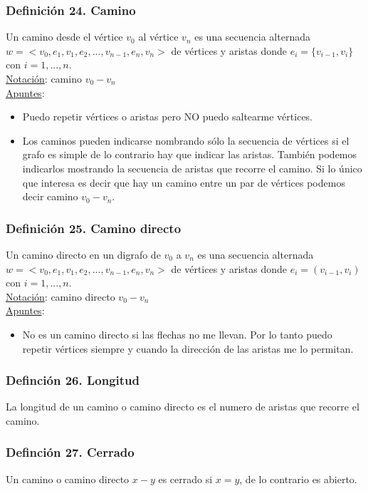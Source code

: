 \documentclass{article}
\begin{document}
\subsubsection*{Definición 24. Camino}
Un camino desde el vértice $v_0$ al vértice $v_n$ es una secuencia alternada $w =< v_0,e_1,v_1,e_2,...,v_{n-1},e_n,v_n>$ de vértices y aristas donde $e_i=\{v_{i-1}, v_i\}$ con $i = 1,...,n$.
\\\underline{Notación}: camino $v_0 - v_n$
\\\underline{Apuntes}:
\begin{itemize}
    \item Puedo repetir vértices o aristas pero NO puedo saltearme vértices.
    \item Los caminos pueden indicarse nombrando sólo la secuencia de vértices si el grafo es simple de lo contrario hay que indicar las aristas.
    También podemos indicarlos mostrando la secuencia de aristas que recorre el camino. 
    Si lo único que interesa es decir que hay un camino entre un par de vértices podemos decir camino $v_0 - v_n$.
\end{itemize}

\subsubsection*{Definición 25. Camino directo}
Un camino directo en un digrafo de $v_0$ a $v_n$ es una secuencia alternada $w =< v_0,e_1,v_1,e_2,...,v_{n-1},e_n,v_n>$ de vértices y aristas donde $e_i=(v_{i-1}, v_i)$ con $i = 1,...,n$.
\\\underline{Notación}: camino directo $v_0 - v_n$
\\\underline{Apuntes}:
\begin{itemize}
    \item No es un camino directo si las flechas no me llevan. Por lo tanto puedo repetir vértices siempre y cuando la dirección de las aristas me lo permitan.
\end{itemize}

\subsubsection*{Definción 26. Longitud}
La longitud de un camino o camino directo es el numero de aristas que recorre el camino.

\subsubsection*{Definción 27. Cerrado}
Un camino o camino directo $x-y$ es cerrado si $x=y$, de lo contrario es abierto.
\end{document}
